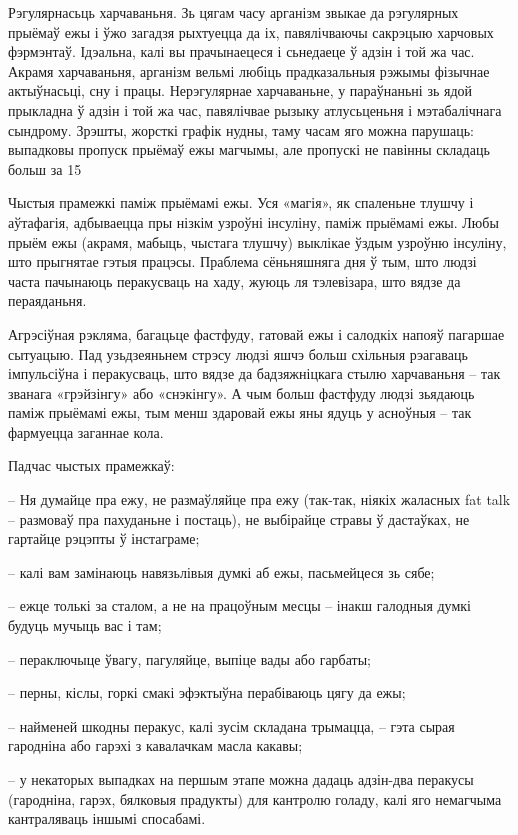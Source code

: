 Рэгулярнасьць харчаваньня. Зь цягам часу арганізм звыкае да рэгулярных прыёмаў ежы і ўжо загадзя рыхтуецца да іх, павялічваючы сакрэцыю харчовых фэрмэнтаў. Ідэальна, калі вы прачынаецеся і сьнедаеце ў адзін і той жа час. Акрамя харчаваньня, арганізм вельмі любіць прадказальныя рэжымы фізычнае актыўнасьці, сну і працы. Нерэгулярнае харчаваньне, у параўнаньні зь ядой прыкладна ў адзін і той жа час, павялічвае рызыку атлусьценьня і мэтабалічнага сындрому. Зрэшты, жорсткі графік нудны, таму часам яго можна парушаць: выпадковы пропуск прыёмаў ежы магчымы, але пропускі не павінны складаць больш за 15%

Чыстыя прамежкі паміж прыёмамі ежы. Уся «магія», як спаленьне тлушчу і аўтафагія, адбываецца пры нізкім узроўні інсуліну, паміж прыёмамі ежы. Любы прыём ежы (акрамя, мабыць, чыстага тлушчу) выклікае ўздым узроўню інсуліну, што прыгнятае гэтыя працэсы. Праблема сёньняшняга дня ў тым, што людзі часта пачынаюць перакусваць на хаду, жуюць ля тэлевізара, што вядзе да пераяданьня.

Агрэсіўная рэкляма, багацьце фастфуду, гатовай ежы і салодкіх напояў пагаршае сытуацыю. Пад узьдзеяньнем стрэсу людзі яшчэ больш схільныя рэагаваць імпульсіўна і перакусваць, што вядзе да бадзяжніцкага стылю харчаваньня – так званага «грэйзінгу» або «снэкінгу». А чым больш фастфуду людзі зьядаюць паміж прыёмамі ежы, тым менш здаровай ежы яны ядуць у асноўныя – так фармуецца заганнае кола.

Падчас чыстых прамежкаў: 

– Ня думайце пра ежу, не размаўляйце пра ежу (так-так, ніякіх жаласных fat talk – размоваў пра пахуданьне і постаць), не выбірайце стравы ў дастаўках, не гартайце рэцэпты ў інстаграме;

– калі вам замінаюць навязьлівыя думкі аб ежы, пасьмейцеся зь сябе;

– ежце толькі за сталом, а не на працоўным месцы – інакш галодныя думкі будуць мучыць вас і там;

– пераключыце ўвагу, пагуляйце, выпіце вады або гарбаты;

– перны, кіслы, горкі смакі эфэктыўна перабіваюць цягу да ежы;

– найменей шкодны перакус, калі зусім складана трымацца, – гэта сырая гародніна або гарэхі з кавалачкам масла какавы;

– у некаторых выпадках на першым этапе можна дадаць адзін-два перакусы (гародніна, гарэх, бялковыя прадукты) для кантролю голаду, калі яго немагчыма кантраляваць іншымі спосабамі.

